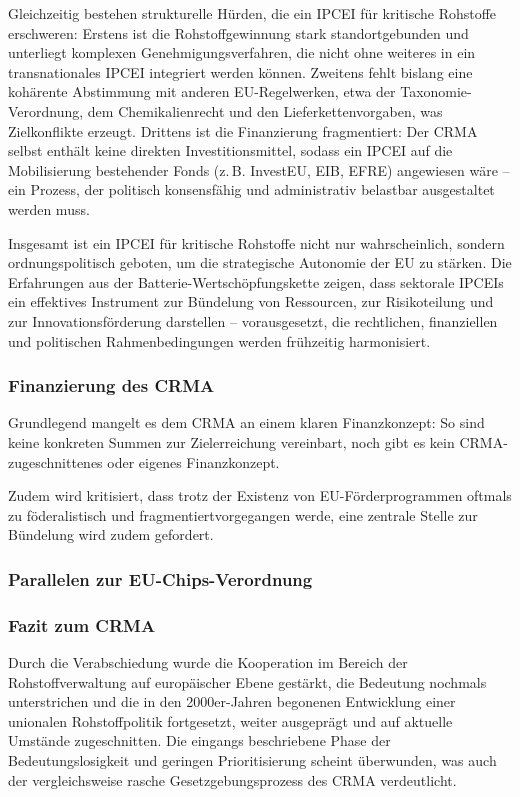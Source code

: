 \documentclass[12pt,a4paper,oneside]{book} %
\begin{document}
Gleichzeitig bestehen strukturelle Hürden, die ein IPCEI für kritische Rohstoffe erschweren: Erstens ist die Rohstoffgewinnung stark standortgebunden und unterliegt komplexen Genehmigungsverfahren, die nicht ohne weiteres in ein transnationales IPCEI integriert werden können. Zweitens fehlt bislang eine kohärente Abstimmung mit anderen EU-Regelwerken, etwa der Taxonomie-Verordnung, dem Chemikalienrecht und den Lieferkettenvorgaben, was Zielkonflikte erzeugt. Drittens ist die Finanzierung fragmentiert: Der CRMA selbst enthält keine direkten Investitionsmittel, sodass ein IPCEI auf die Mobilisierung bestehender Fonds (z. B. InvestEU, EIB, EFRE) angewiesen wäre – ein Prozess, der politisch konsensfähig und administrativ belastbar ausgestaltet werden muss.

Insgesamt ist ein IPCEI für kritische Rohstoffe nicht nur wahrscheinlich, sondern ordnungspolitisch geboten, um die strategische Autonomie der EU zu stärken. Die Erfahrungen aus der Batterie-Wertschöpfungskette zeigen, dass sektorale IPCEIs ein effektives Instrument zur Bündelung von Ressourcen, zur Risikoteilung und zur Innovationsförderung darstellen – vorausgesetzt, die rechtlichen, finanziellen und politischen Rahmenbedingungen werden frühzeitig harmonisiert.

\subsubsection{Finanzierung des CRMA}

Grundlegend mangelt es dem CRMA an einem klaren Finanzkonzept: So sind keine konkreten Summen zur Zielerreichung vereinbart, noch gibt es kein CRMA-zugeschnittenes oder eigenes Finanzkonzept.

Zudem wird kritisiert, dass trotz der Existenz von EU-Förderprogrammen oftmals \glqq zu föderalistisch und fragmentiert\grqq vorgegangen werde, eine zentrale Stelle zur Bündelung wird zudem gefordert.\autocite{Je länger die EU untätig bleibt, umso verwundbarer macht sie sich}

\subsubsection{Parallelen zur EU-Chips-Verordnung}




\subsubsection{Fazit zum CRMA}
Durch die Verabschiedung wurde die Kooperation im Bereich der Rohstoffverwaltung auf europäischer Ebene gestärkt, die Bedeutung nochmals unterstrichen und die in den 2000er-Jahren begonenen Entwicklung einer unionalen Rohstoffpolitik fortgesetzt, weiter ausgeprägt und auf aktuelle Umstände zugeschnitten. Die eingangs beschriebene Phase der Bedeutungslosigkeit und geringen Prioritisierung scheint überwunden, was auch der vergleichsweise rasche Gesetzgebungsprozess des CRMA verdeutlicht.
\end{document}
